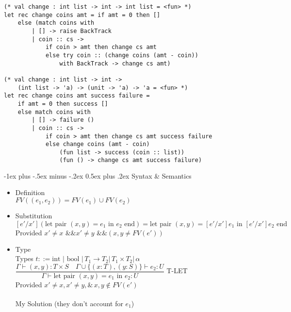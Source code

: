 \documentclass[12pt]{article}
\makeatletter
\renewcommand{\section}{\@startsection{section}{1}{0mm}%
                                    {-1ex plus -.5ex minus -.2ex}%
                                    {0.5ex plus .2ex}%
                                    {\normalfont\large\bfseries\color{header}}}
\makeatother
\begin{document}
\begin{multicols}{2}
\begin{lstlisting}
(* val change : int list -> int -> int list = <fun> *)
let rec change coins amt = if amt = 0 then []
    else (match coins with 
        | [] -> raise BackTrack
        | coin :: cs ->
            if coin > amt then change cs amt
            else try coin :: (change coins (amt - coin)) 
                with BackTrack -> change cs amt)

(* val change : int list -> int -> 
    (int list -> 'a) -> (unit -> 'a) -> 'a = <fun> *)
let rec change coins amt success failure = 
    if amt = 0 then success []
    else match coins with
        | [] -> failure ()
        | coin :: cs -> 
            if coin > amt then change cs amt success failure
            else change coins (amt - coin)
                (fun list -> success (coin :: list))
                (fun () -> change cs amt success failure)
\end{lstlisting}

\section{Syntax \& Semantics}

\begin{itemize}[noitemsep, nosep]
    \item Definition \\
    $FV((e_1, e_2)) = FV(e_1) \cup FV(e_2)$
    \item Substitution \\
    $[e'/x'](\text{let pair } (x, y) = e_1 \text{ in } e_2 \text{ end}) = \text{let pair } (x, y) = [e'/x']e_1 \text{ in } [e'/x']e_2 \text{ end}$ \\
    Provided $x' \ne x \text{ \&\& } x' \ne y \text{ \&\& } (x, y \ne FV(e'))$
    \item Type \\
    Types $t ::= \text{int } \vert \text{ bool } \vert \, T_1 \rightarrow T_2 \vert \, T_1 \times T_2 \vert \, \alpha$ \\
    $\dfrac{\Gamma \vdash (x, y): T \times S \quad \Gamma \cup \{(x: T), (y: S)\} \vdash e_2: U}{\Gamma \vdash \text{let pair } (x, y) = e_1 \text{ in } e_2: U}$ T-LET \\
    Provided $x' \ne x, x' \ne y, \& \, x, y \notin FV(e')$ \\~\\
    My Solution (they don't account for $e_1$) \\


\end{itemize}
\end{multicols}
\end{document}
